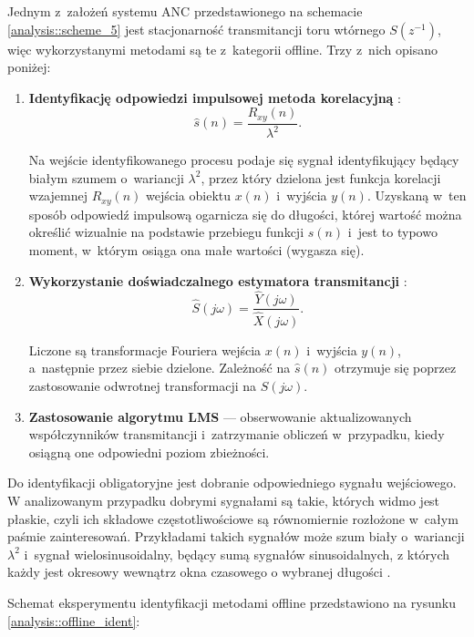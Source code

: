 Jednym z~założeń systemu ANC przedstawionego na schemacie
\ref{analysis::scheme_5} jest stacjonarność transmitancji toru wtórnego
$S(z^{-1})$, więc wykorzystanymi metodami są te z~kategorii offline. Trzy z~nich
opisano poniżej:

\begin{enumerate}

    \item \textbf{Identyfikację odpowiedzi impulsowej metoda korelacyjną}
    \cite{bib:figwer}:
    \begin{equation}
        \hat{s}(n) = \frac{R_{xy}(n)}{\lambda^2}.
    \end{equation}

    Na wejście identyfikowanego procesu podaje się sygnał identyfikujący będący
    białym szumem o~wariancji $\lambda^2$, przez który dzielona jest funkcja
    korelacji wzajemnej $R_{xy}(n)$ wejścia obiektu $x(n)$ i~wyjścia $y(n)$.
    Uzyskaną w~ten sposób odpowiedź impulsową ogarnicza się do długości, której
    wartość można określić wizualnie na podstawie przebiegu funkcji $\hat{s}(n)$
    i~jest to typowo moment, w~którym osiąga ona małe wartości (wygasza się).

    \item \textbf{Wykorzystanie doświadczalnego estymatora transmitancji}
    \cite{bib:stoica}:
    \begin{equation}
        \hat{S}(j\omega) = \frac{\hat{Y}(j\omega)}{\hat{X}(j\omega)}.
    \end{equation}

    Liczone są transformacje Fouriera wejścia $x(n)$ i~wyjścia $y(n)$,
    a~następnie przez siebie dzielone. Zależność na $\hat{s}(n)$ otrzymuje się
    poprzez zastosowanie odwrotnej transformacji na $\hat{S}(j\omega)$.

    \item \textbf{Zastosowanie algorytmu LMS} --- obserwowanie aktualizowanych
    współczynników transmitancji i~zatrzymanie obliczeń w~przypadku, kiedy
    osiągną one odpowiedni poziom zbieżności.

\end{enumerate}

Do identyfikacji obligatoryjne jest dobranie odpowiedniego sygnału wejściowego.
W analizowanym przypadku dobrymi sygnałami są takie, których widmo jest płaskie,
czyli ich składowe częstotliwościowe są równomiernie rozłożone w~całym paśmie
zainteresowań. Przykładami takich sygnałów może szum biały o~wariancji
$\lambda^2$ i~sygnał wielosinusoidalny, będący sumą sygnałów sinusoidalnych, z
których każdy jest okresowy wewnątrz okna czasowego o wybranej długości
\cite{bib:figwer}. \par Schemat eksperymentu identyfikacji metodami offline
przedstawiono na rysunku \ref{analysis::offline_ident}:

